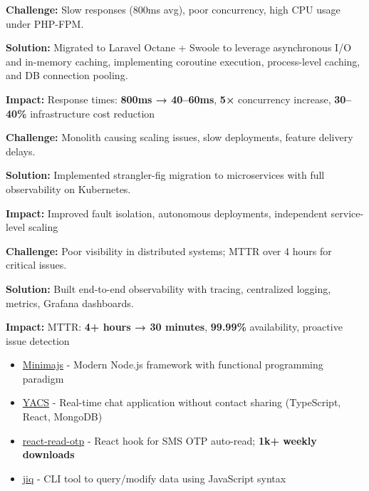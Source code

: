 \documentclass[10pt,a4paper,ragged2e,withhyper]{altacv}
\begin{document}
{\small\textbf{Challenge:}} Slow responses (800ms avg), poor concurrency, high CPU usage under PHP-FPM.

{\small\textbf{Solution:}} Migrated to Laravel Octane + Swoole to leverage asynchronous I/O and in-memory caching, implementing coroutine execution, process-level caching, and DB connection pooling.

{\small\textbf{Impact:}} Response times: \textbf{800ms → 40–60ms}, \textbf{5×} concurrency increase, \textbf{30–40\%} infrastructure cost reduction

\divider


{\small{}     }

\smallskip

{\small\textbf{Challenge:}} Monolith causing scaling issues, slow deployments, feature delivery delays.

{\small\textbf{Solution:}} Implemented strangler-fig migration to microservices with full observability on Kubernetes.

{\small\textbf{Impact:}} Improved fault isolation, autonomous deployments, independent service-level scaling

\divider


{\small{}     }

\smallskip

{\small\textbf{Challenge:}} Poor visibility in distributed systems; MTTR over 4 hours for critical issues.

{\small\textbf{Solution:}} Built end-to-end observability with tracing, centralized logging, metrics, Grafana dashboards.

{\small\textbf{Impact:}} MTTR: \textbf{4+ hours → 30 minutes}, \textbf{99.99\%} availability, proactive issue detection

\pagebreak


\begin{itemize}
\item \href{https://minima-js.github.io/}{Minimajs} - Modern Node.js framework with functional programming paradigm
\item \href{https://yacs.in}{YACS} - Real-time chat application without contact sharing (TypeScript, React, MongoDB)
\item \href{https://www.npmjs.com/package/react-read-otp}{react-read-otp} - React hook for SMS OTP auto-read; \textbf{1k+ weekly downloads}
\item \href{https://md-adil.github.io/jiq/}{jiq} - CLI tool to query/modify data using JavaScript syntax
\end{itemize}
\end{document}
